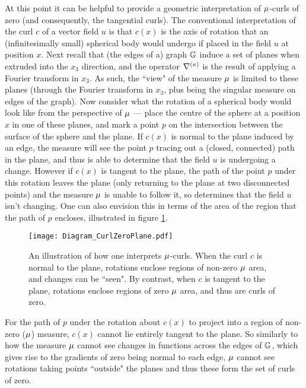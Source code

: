 At this point it can be helpful to provide a geometric interpretation of $\mu$-curls of zero (and consequently, the tangential curls).
The conventional interpretation of the curl $c$ of a vector field $u$ is that $c(x)$ is the axis of rotation that an (infinitesimally small) spherical body would undergo if placed in the field $u$ at position $x$.
Next recall that (the edges of a) graph $\mathbb{G}$ induce a set of planes when extruded into the $x_3$ direction, and the operator $\nabla^{(\kappa)}$ is the result of applying a Fourier transform in $x_3$.
As such, the ``view" of the measure $\mu$ is limited to these planes (through the Fourier transform in $x_3$, plus being the singular measure on edges of the graph).
Now consider what the rotation of a spherical body would look like from the perspective of $\mu$ --- place the centre of the sphere at a position $x$ in one of these planes, and mark a point $p$ on the intersection between the surface of the sphere and the plane. 
If $c(x)$ is normal to the plane induced by an edge, the measure will see the point $p$ tracing out a (closed, connected) path in the plane, and thus is able to determine that the field $u$ is undergoing a change.
However if $c(x)$ is tangent to the plane, the path of the point $p$ under this rotation leaves the plane (only returning to the plane at two disconnected points) and the measure $\mu$ is unable to follow it, so determines that the field $u$ isn't changing.
One can also envision this in terms of the area of the region that the path of $p$ encloses, illustrated in figure \ref{fig:Diagram_CurlZeroPlane}.
\begin{figure}[t!]
	\centering
	\texttt{[image: Diagram\_CurlZeroPlane.pdf]}
	\caption{\label{fig:Diagram_CurlZeroPlane} An illustration of how one interprets $\mu$-curls. When the curl $c$ is normal to the plane, rotations enclose regions of non-zero $\mu$ area, and changes can be ``seen". By contrast, when $c$ is tangent to the plane, rotations enclose regions of zero $\mu$ area, and thus are curls of zero.}
\end{figure}
For the path of $p$ under the rotation about $c(x)$ to project into a region of non-zero ($\mu$) measure, $c(x)$ cannot lie entirely tangent to the plane.
So similarly to how the measure $\mu$ cannot see changes in functions across the edges of $\mathbb{G}$, which gives rise to the gradients of zero being normal to each edge, $\mu$ cannot see rotations taking points ``outside" the planes and thus these form the set of curls of zero.

